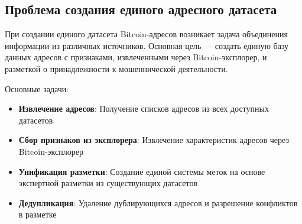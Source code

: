 \subsection{Проблема создания единого адресного датасета}

При создании единого датасета Bitcoin-адресов возникает задача объединения информации из различных источников. Основная цель — создать единую базу данных адресов с признаками, извлеченными через Bitcoin-эксплорер, и разметкой о принадлежности к мошеннической деятельности.

Основные задачи:

\begin{itemize}
    \item \textbf{Извлечение адресов}: Получение списков адресов из всех доступных датасетов
    \item \textbf{Сбор признаков из эксплорера}: Извлечение характеристик адресов через Bitcoin-эксплорер
    \item \textbf{Унификация разметки}: Создание единой системы меток на основе экспертной разметки из существующих датасетов
    \item \textbf{Дедупликация}: Удаление дублирующихся адресов и разрешение конфликтов в разметке
\end{itemize}
